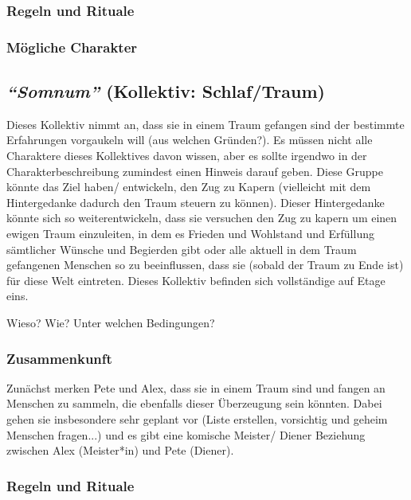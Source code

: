 \documentclass[12pt, a4paper, openany]{report}
\begin{document}
\subsubsection{Regeln und Rituale}
\subsubsection{Mögliche Charakter}



\subsection{\emph{``Somnum''} (Kollektiv: Schlaf/Traum)}
Dieses Kollektiv nimmt an, dass sie in einem Traum gefangen sind der bestimmte Erfahrungen vorgaukeln will (aus welchen Gründen?).
Es müssen nicht alle Charaktere dieses Kollektives davon wissen, aber es sollte irgendwo in der Charakterbeschreibung zumindest einen Hinweis darauf geben.
Diese Gruppe könnte das Ziel haben/ entwickeln, den Zug zu Kapern (vielleicht mit dem Hintergedanke dadurch den Traum steuern zu können).
Dieser Hintergedanke könnte sich so weiterentwickeln, dass sie versuchen den Zug
zu kapern um einen ewigen Traum einzuleiten, in dem es Frieden und Wohlstand und Erfüllung sämtlicher Wünsche und Begierden gibt oder alle aktuell in dem Traum
gefangenen Menschen so zu beeinflussen, dass sie (sobald der Traum zu Ende ist)
für diese Welt eintreten.
Dieses Kollektiv befinden sich vollständige auf Etage eins.

Wieso? Wie? Unter welchen Bedingungen?

\subsubsection{Zusammenkunft}
Zunächst merken Pete und Alex, dass sie in einem Traum sind und fangen an
Menschen zu sammeln, die ebenfalls dieser Überzeugung sein könnten. 
Dabei gehen sie insbesondere sehr geplant vor (Liste erstellen, vorsichtig und 
geheim Menschen fragen...) und es gibt eine komische Meister/ Diener Beziehung 
zwischen Alex (Meister*in) und Pete (Diener). 

\subsubsection{Regeln und Rituale}
\end{document}

